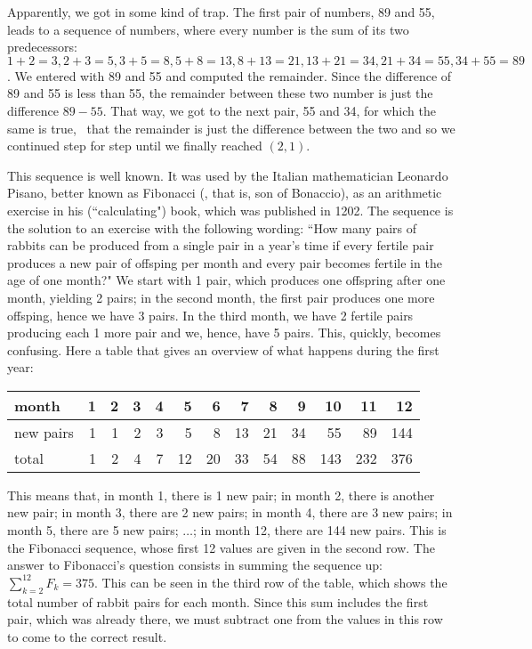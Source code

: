 \documentclass{scrreprt}
\begin{document}
Apparently, we got in some kind of trap.
The first pair of numbers, 89 and 55,
leads to a sequence of numbers, where 
every number is the sum of its two predecessors:
$1 + 2 = 3, 2 + 3 = 5, 3 + 5 = 8, 5 + 8 = 13,
 8 + 13 = 21, 13 + 21 = 34, 21 + 34 = 55, 34 + 55 = 89$.
We entered with 89 and 55 and 
computed the remainder.
Since the difference of 89 and 55
is less than 55,
the remainder between these two number
is just the difference $89-55$.
That way,
we got to the next pair, 55 and 34,
for which the same is true,
\viz\ that the remainder is just
the difference between the two and so 
we continued step for step 
until we finally reached $(2,1)$.

This sequence is well known.
It was used by the Italian mathematician
Leonardo Pisano, better known as Fibonacci
(, that is, son of Bonaccio),
as an arithmetic exercise in his 
(``calculating") book, which was published in 1202.
The sequence is the solution to an exercise
with the following wording:
``How many pairs of rabbits can be produced
  from a single pair in a year's time
  if every fertile pair produces a new pair
  of offsping per month and every pair
  becomes fertile in the age of one month?"
We start with 1 pair, which produces one offspring
after one month, yielding 2 pairs; in the second month,
the first pair produces one more offsping,
hence we have 3 pairs. In the third month,
we have 2 fertile pairs producing each 1 more pair
and we, hence, have 5 pairs. 
This, quickly, becomes confusing.
Here a table that gives an overview of what happens
during the first year:

\begin{center}
\begin{tabular}{l|r|r|r|r|r|r|r|r|r|r|r|r}
month     & 1 & 2 & 3 & 4 &  5 &  6 &   7 &   8 &  9 &  10 &  11 &   12 \\\hline
new pairs & 1 & 1 & 2 & 3 &  5 &  8 &  13 &  21 & 34 &  55 &  89 &  144 \\\hline
total     & 1 & 2 & 4 & 7 & 12 & 20 &  33 &  54 & 88 & 143 & 232 &  376 
\end{tabular}
\end{center}

This means that,
in month 1, there is 1 new pair;
in month 2, there is another new pair;
in month 3, there are 2 new pairs;
in month 4, there are 3 new pairs;
in month 5, there are 5 new pairs;
$\dots$;
in month 12, there are 144 new pairs.
This is the Fibonacci sequence,
whose first 12 values are given in the second row. 
The answer to Fibonacci's question
consists in summing the sequence up:
$\sum_{k=2}^{12}{F_k} = 375$.
This can be seen in the third row of the table,
which shows the total number of rabbit pairs for each month.
Since this sum includes the first pair,
which was already there,
we must subtract one from the values in this row
to come to the correct result.
\end{document}
